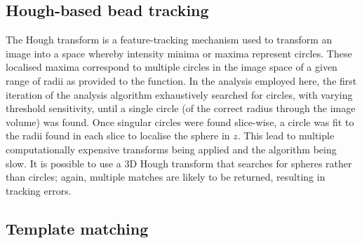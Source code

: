 \subsection{Hough-based bead tracking}

The Hough transform is a feature-tracking mechanism used to transform an image into a space whereby intensity minima or maxima represent circles.
These localised maxima correspond to multiple circles in the image space of a given range of radii as provided to the function.
In the analysis employed here, the first iteration of the analysis algorithm exhaustively searched for circles, with varying threshold sensitivity, until a single circle (of the correct radius through the image volume) was found.
Once singular circles were found slice-wise, a circle was fit to the radii found in each slice to localise the sphere in \(z\).
This lead to multiple computationally expensive transforms being applied and the algorithm being slow.
It is possible to use a 3D Hough transform that searches for spheres rather than circles; again, multiple matches are likely to be returned, resulting in tracking errors.

\subsection{Template matching}

